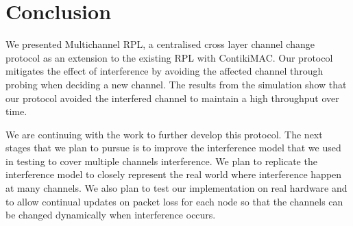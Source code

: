 \section{Conclusion}
\label{sec:conclusion}


We presented Multichannel RPL, a centralised cross layer channel change protocol as an extension to the existing RPL with ContikiMAC. Our protocol mitigates the effect of interference by avoiding the affected channel through probing when deciding a new channel. The results from the simulation show that our protocol avoided the interfered channel to maintain a high throughput over time. 

We are continuing with the work to further develop this protocol. The next stages that we plan to pursue is to improve the interference model that we used in testing to cover multiple channels interference. We plan to replicate the interference model to closely represent the real world where interference happen at many channels. We also plan to test our implementation on real hardware and to allow continual updates on packet loss for each node so that the channels can be changed dynamically when interference occurs.


